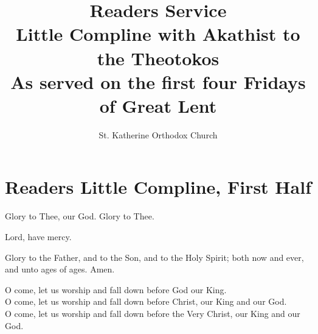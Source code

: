 \documentclass[twoside, letterpaper, 12pt]{report}
\title{Readers Service \\
       Little Compline with Akathist to the Theotokos\\
       As served on the first four Fridays of Great Lent}
\author{St. Katherine Orthodox Church}
\date{}%
\begin{document}
\maketitle
\pagestyle{empty} %


\cleardoublepage
\pagestyle{plain}
\setcounter{page}{1}

\chapter*{Readers Little Compline, First Half}

\begin{reader}
\item \throughtheprayers{}
\end{reader}


\begin{reader}
\item Glory to Thee, our God. Glory to Thee.
\item 
\end{reader}

\trisagionNeedsAmen[reader]


\begin{reader}
\item Lord, have mercy. \twelve
\item Glory to the Father, and to the Son, and to the Holy Spirit;
  both now and ever, 
  and unto ages of ages. Amen.

\item O come, let us worship and fall down before God our King.\\
  O come, let us worship and fall down before Christ, our King and our God.\\
  O come, let us worship and fall down before the Very Christ, our King and our God.
\end{reader}
\end{document}
